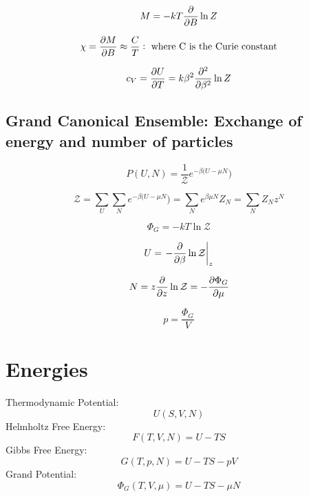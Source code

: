 \documentclass{article}
\begin{document}
\begin{equation}
	M=-kT\pdv{B}\ln Z
\end{equation}

\begin{equation}
	\chi=\pdv{M}{B}\approx\frac{C}{T}:\text{   where C is the Curie constant}
\end{equation}

\begin{equation}
	c_V=\pdv{U}{T}=k\beta ^2\pdv[2]{\beta}\ln Z
\end{equation}

\subsection{Grand Canonical Ensemble: \normalfont Exchange of energy and number of particles}

\begin{equation}
	P(U,N)=\frac{1}{\mathcal{Z}}e^{-\beta(U-\mu N})
\end{equation}

\begin{equation}
	\mathcal{Z}=\sum_U \sum_N e^{-\beta(U-\mu N})=\sum_N e^{\beta\mu N}Z_N=\sum_N Z_Nz^N
\end{equation}

\begin{equation}
	\Phi_G=-kT\ln\mathcal{Z}
\end{equation}

\begin{equation}
	U=\left.-\pdv{\beta}\ln\mathcal{Z}\right\rvert_z
\end{equation}

\begin{equation}
	N=z\pdv{z}\ln\mathcal{Z}=-\pdv{\Phi_G}{\mu}
\end{equation}

\begin{equation}
	p=\frac{\Phi_G}{V}
\end{equation}

\section{Energies}

Thermodynamic Potential:
\begin{equation}
	U(S, V, N)
\end{equation}
%
Helmholtz Free Energy:
\begin{equation}
	F(T, V, N)=U-TS
\end{equation}
%
Gibbs Free Energy:
\begin{equation}
	G(T, p, N)=U-TS-pV
\end{equation}
%
Grand Potential:
\begin{equation}
	\Phi_G(T, V, \mu)=U-TS-\mu N
\end{equation}
\end{document}
